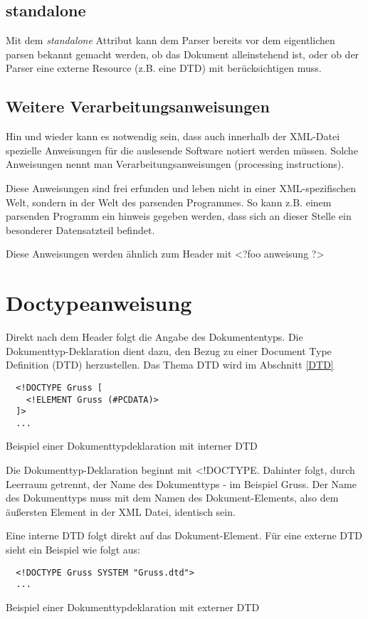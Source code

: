 \subsection{standalone}
Mit dem \textit{standalone} Attribut kann dem Parser bereits vor dem eigentlichen parsen bekannt gemacht werden, ob das
Dokument alleinstehend ist, oder ob der Parser eine externe Resource (z.B. eine DTD) mit berücksichtigen muss.

\subsection{Weitere Verarbeitungsanweisungen}
Hin und wieder kann es notwendig sein, dass auch innerhalb der XML-Datei spezielle Anweisungen für die auslesende
Software notiert werden müssen. Solche Anweisungen nennt man Verarbeitungsanweisungen (processing instructions).

Diese Anweisungen sind frei erfunden und leben nicht in einer XML-spezifischen Welt, sondern in der Welt des parsenden
Programmes. So kann z.B. einem parsenden Programm ein hinweis gegeben werden, dass sich an dieser Stelle ein besonderer
Datensatzteil befindet.

Diese Anweisungen werden ähnlich zum Header mit \textless?foo anweisung ?\textgreater

\section{Doctypeanweisung}\label{xml:doctype}
Direkt nach dem Header folgt die Angabe des Dokumententyps. 
Die Dokumenttyp-Deklaration dient dazu, den Bezug zu einer Document Type Definition (DTD) herzustellen. Das Thema DTD
wird im Abschnitt \ref{DTD}
\begin{listing}[H]
\begin{verbatim}
  <!DOCTYPE Gruss [
    <!ELEMENT Gruss (#PCDATA)>
  ]>
  ...
\end{verbatim}
\caption{Beispiel einer Dokumenttypdeklaration mit interner DTD}
\end{listing}
Die Dokumenttyp-Deklaration beginnt mit \textless!DOCTYPE. Dahinter folgt, durch Leerraum getrennt, der Name des Dokumenttyps - im
Beispiel Gruss. Der Name des Dokumenttyps muss mit dem Namen des Dokument-Elements, also dem äußersten Element in der
XML Datei, identisch sein.

Eine interne DTD folgt direkt auf das Dokument-Element. Für eine externe DTD sieht ein Beispiel wie folgt aus:
\begin{listing}[H]
\begin{verbatim}
  <!DOCTYPE Gruss SYSTEM "Gruss.dtd">
  ...
\end{verbatim}
\caption{Beispiel einer Dokumenttypdeklaration mit externer DTD}
\end{listing}

